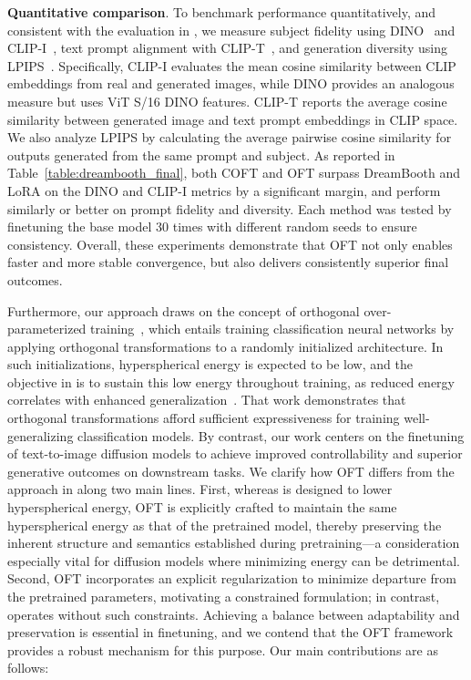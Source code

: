 \begin{itemize}[leftmargin=*,nosep]
\begin{itemize}[leftmargin=*,nosep]
\textbf{Quantitative comparison}. To benchmark performance quantitatively, and consistent with the evaluation in \cite{ruiz2023dreambooth}, we measure subject fidelity using DINO~\cite{caron2021emerging} and CLIP-I~\cite{radford2021learning}, text prompt alignment with CLIP-T~\cite{radford2021learning}, and generation diversity using LPIPS~\cite{zhang2018unreasonable}. Specifically, CLIP-I evaluates the mean cosine similarity between CLIP embeddings from real and generated images, while DINO provides an analogous measure but uses ViT S/16 DINO features. CLIP-T reports the average cosine similarity between generated image and text prompt embeddings in CLIP space. We also analyze LPIPS by calculating the average pairwise cosine similarity for outputs generated from the same prompt and subject. As reported in Table~\ref{table:dreambooth_final}, both COFT and OFT surpass DreamBooth and LoRA on the DINO and CLIP-I metrics by a significant margin, and perform similarly or better on prompt fidelity and diversity. Each method was tested by finetuning the base model 30 times with different random seeds to ensure consistency. Overall, these experiments demonstrate that OFT not only enables faster and more stable convergence, but also delivers consistently superior final outcomes.

Furthermore, our approach draws on the concept of orthogonal over-parameterized training~\cite{liu2021orthogonal}, which entails training classification neural networks by applying orthogonal transformations to a randomly initialized architecture. In such initializations, hyperspherical energy is expected to be low, and the objective in \cite{liu2021orthogonal} is to sustain this low energy throughout training, as reduced energy correlates with enhanced generalization~\cite{liu2018learning,lin2020regularizing}. That work demonstrates that orthogonal transformations afford sufficient expressiveness for training well-generalizing classification models. By contrast, our work centers on the finetuning of text-to-image diffusion models to achieve improved controllability and superior generative outcomes on downstream tasks. We clarify how OFT differs from the approach in \cite{liu2021orthogonal} along two main lines. First, whereas \cite{liu2021orthogonal} is designed to lower hyperspherical energy, OFT is explicitly crafted to maintain the same hyperspherical energy as that of the pretrained model, thereby preserving the inherent structure and semantics established during pretraining—a consideration especially vital for diffusion models where minimizing energy can be detrimental. Second, OFT incorporates an explicit regularization to minimize departure from the pretrained parameters, motivating a constrained formulation; in contrast, \cite{liu2021orthogonal} operates without such constraints. Achieving a balance between adaptability and preservation is essential in finetuning, and we contend that the OFT framework provides a robust mechanism for this purpose. Our main contributions are as follows:


\end{itemize}
\end{itemize}

